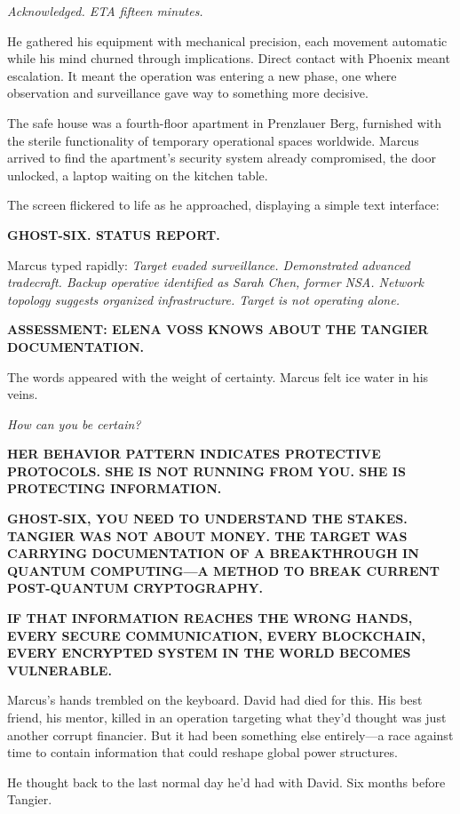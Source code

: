 \emph{Acknowledged. ETA fifteen minutes.}

He gathered his equipment with mechanical precision, each movement automatic while his mind churned through implications. Direct contact with Phoenix meant escalation. It meant the operation was entering a new phase, one where observation and surveillance gave way to something more decisive.

The safe house was a fourth-floor apartment in Prenzlauer Berg, furnished with the sterile functionality of temporary operational spaces worldwide. Marcus arrived to find the apartment's security system already compromised, the door unlocked, a laptop waiting on the kitchen table.

The screen flickered to life as he approached, displaying a simple text interface:

\textbf{GHOST-SIX. STATUS REPORT.}

Marcus typed rapidly: \emph{Target evaded surveillance. Demonstrated advanced tradecraft. Backup operative identified as Sarah Chen, former NSA. Network topology suggests organized infrastructure. Target is not operating alone.}

\textbf{ASSESSMENT: ELENA VOSS KNOWS ABOUT THE TANGIER DOCUMENTATION.}

The words appeared with the weight of certainty. Marcus felt ice water in his veins.

\emph{How can you be certain?}

\textbf{HER BEHAVIOR PATTERN INDICATES PROTECTIVE PROTOCOLS. SHE IS NOT RUNNING FROM YOU. SHE IS PROTECTING INFORMATION.}

\textbf{GHOST-SIX, YOU NEED TO UNDERSTAND THE STAKES. TANGIER WAS NOT ABOUT MONEY. THE TARGET WAS CARRYING DOCUMENTATION OF A BREAKTHROUGH IN QUANTUM COMPUTING---A METHOD TO BREAK CURRENT POST-QUANTUM CRYPTOGRAPHY.}

\textbf{IF THAT INFORMATION REACHES THE WRONG HANDS, EVERY SECURE COMMUNICATION, EVERY BLOCKCHAIN, EVERY ENCRYPTED SYSTEM IN THE WORLD BECOMES VULNERABLE.}

Marcus's hands trembled on the keyboard. David had died for this. His best friend, his mentor, killed in an operation targeting what they'd thought was just another corrupt financier. But it had been something else entirely---a race against time to contain information that could reshape global power structures.

He thought back to the last normal day he'd had with David. Six months before Tangier.

